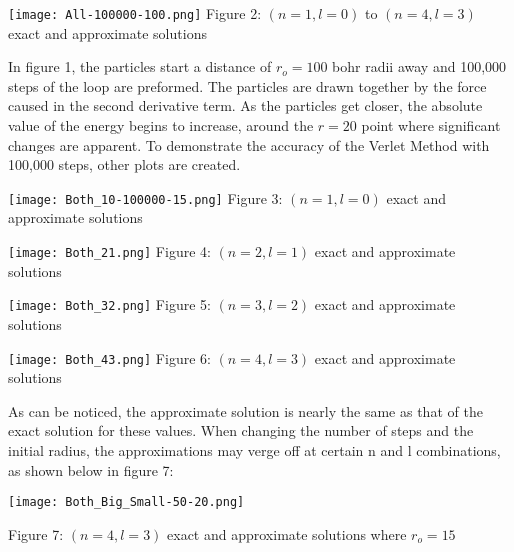 \documentclass{article}
\begin{document}
\begin{center}
\texttt{[image: All-100000-100.png]}
\scriptsize{
Figure 2: $(n=1 , l=0)$ to $(n=4 , l=3)$ exact and approximate solutions
}
\end{center}

\vspace{0.1in}

\normalsize{
In figure 1, the particles start a distance of $r_o = 100$ bohr radii away and 100,000 steps of the loop are preformed. The particles are drawn together by the force caused in the second derivative term. As the particles get closer, the absolute value of the energy begins to increase, around the $r=20$ point where significant changes are apparent. To demonstrate the accuracy of the Verlet Method with 100,000 steps, other plots are created.
}

\vspace{0.1in}



\begin{center}
\texttt{[image: Both\_10-100000-15.png]}
\scriptsize{
Figure 3: $(n=1 , l=0)$ exact and approximate solutions
}
\vspace{0.1in}

\texttt{[image: Both\_21.png]}
Figure 4: $(n=2 , l=1)$ exact and approximate solutions

\vspace{0.1in}

\texttt{[image: Both\_32.png]}
Figure 5: $(n=3 , l=2)$ exact and approximate solutions

\vspace{0.1in}

\texttt{[image: Both\_43.png]}
Figure 6: $(n=4 , l=3)$ exact and approximate solutions

\end{center}

\vspace{0.1in}

\normalsize{
As can be noticed, the approximate solution is nearly the same as that of the exact solution for these values. When changing the number of steps and the initial radius, the approximations may verge off at certain n and l combinations, as shown below in figure 7:
}

\texttt{[image: Both\_Big\_Small-50-20.png]}
\scriptsize{
\begin{center}
Figure 7: $(n=4 , l=3)$ exact and approximate solutions where $r_o = 15$
\end{center}
}
\end{document}
